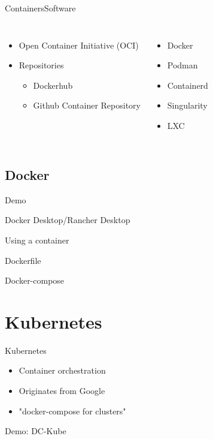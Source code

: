 \documentclass{dcpresentation}
\begin{document}
 \begin{frame}{Containers}{Software}
  \begin{columns}
    \begin{itemize}
     \item Open Container Initiative (OCI)
     \item Repositories
     \begin{itemize}
      \item Dockerhub
      \item Github Container Repository   
     \end{itemize}
    \end{itemize}
    \begin{itemize}
     \item Docker
     \item Podman
     \item Containerd
     \item Singularity
     \item LXC
    \end{itemize}
  \end{columns}
 \end{frame}

 \subsection{Docker}

 \begin{frame}
  \begin{center}
   \alert{\Large Demo}
   \vspace{7pt}

   \alert{Docker Desktop/Rancher Desktop}
   \vspace{3pt}
   
   \alert{Using a container}
   \vspace{3pt}
   
   \alert{Dockerfile}
   \vspace{3pt}
   
   \alert{Docker-compose}
  \end{center}
 \end{frame}

 \section{Kubernetes}

 \begin{frame}{Kubernetes}
  \begin{itemize}
   \item Container orchestration
   \item Originates from Google
   \item "docker-compose for clusters"
  \end{itemize}
 \end{frame}  

 \begin{frame}
  \centering \alert{Demo: DC-Kube}
 \end{frame}
\end{document}
